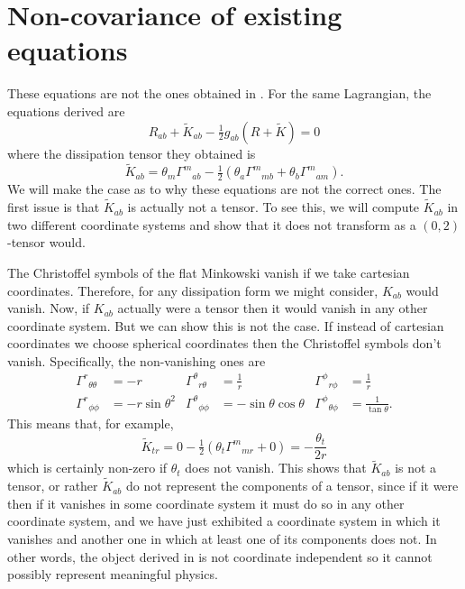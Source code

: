 \documentclass[../main.tex]{subfiles}
\begin{document}
\section{Non-covariance of existing equations}
These equations are not the ones obtained in \cite{Lazo2017}. For the same Lagrangian, the
equations derived are
\begin{equation} \label{eq:EFE lazo}
	R_{ab} + \tilde{K}_{ab} - \tfrac{1}{2}g_{ab}(R + \tilde{K}) = 0
\end{equation}
where the dissipation tensor they obtained is 
\begin{equation} \label{eq:}
	\tilde{K}_{ab} = \theta_m {\Gamma^m}_{ab} - \tfrac{1}{2}\left(\theta_a {\Gamma^m}_{mb} +
	\theta_b {\Gamma^m}_{am}\right). 
\end{equation}
We will make the case as to why these equations are not the correct ones. The first issue
is that \( \tilde{K}_{ab} \) is actually not a tensor. To see this, we will compute \(
\tilde{K}_{ab} \) in two different coordinate systems and show that it does not transform
as a \( (0,2) \)-tensor would. 

The Christoffel symbols of the flat Minkowski vanish if we take cartesian coordinates.
Therefore, for any dissipation form we might consider, \( K_{ab} \) would vanish. Now, if
\( K_{ab} \) actually were a tensor then it would vanish in any other coordinate system.
But we can show this is not the case. If instead of cartesian coordinates we choose
spherical coordinates then the Christoffel symbols don't vanish. Specifically, the
non-vanishing ones are
\begin{align*}
	{\Gamma^r}_{\theta\theta} & = -r & {\Gamma^\theta}_{r\theta} & = \frac{1}{r} &
	{\Gamma^\phi}_{r\phi} & = \frac{1}{r} \\
	{\Gamma^r}_{\phi\phi} & = -r \sin{\theta}^2 & {\Gamma^\theta}_{\phi\phi} & =
	-\sin{\theta}\cos{\theta} & {\Gamma^\phi}_{\theta\phi} & = \frac{1}{\tan{\theta}}. 
\end{align*}
This means that, for example,
\begin{equation*}
	\tilde{K}_{tr} = 0 - \tfrac{1}{2}(\theta_t {\Gamma^m}_{mr} + 0) =
	-\frac{\theta_t}{2r}
\end{equation*}
which is certainly non-zero if \( \theta_t \) does not vanish. This shows that \(
\tilde{K}_{ab} \) is not a tensor, or rather \( \tilde{K}_{ab} \) do not represent the
components of a tensor, since if it were then if it vanishes in some coordinate system it
must do so in any other coordinate system, and we have just exhibited a coordinate system
in which it vanishes and another one in which at least one of its components does not. In
other words, the object derived in \cite{Lazo2017} is not coordinate independent so it
cannot possibly represent meaningful physics. 
\end{document}
